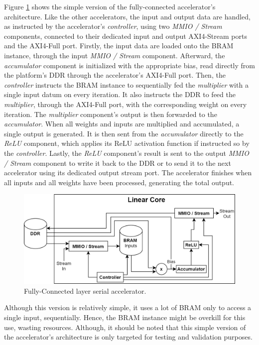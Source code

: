Figure \ref{fig:linear-core-serial} shows the simple version of the fully-connected accelerator's architecture. Like the other accelerators, the input and output data are handled, as instructed by the accelerator's \emph{controller}, using two \emph{MMIO / Stream} components, connected to their dedicated input and output AXI4-Stream ports and the AXI4-Full port. Firstly, the input data are loaded onto the BRAM instance, through the input \emph{MMIO / Stream} component. Afterward, the \emph{accumulator} component is initialized with the appropriate bias, read directly from the platform's DDR through the accelerator's AXI4-Full port. Then, the \emph{controller} instructs the BRAM instance to sequentially fed the \emph{multiplier} with a single input datum on every iteration. It also instructs the DDR to feed the \emph{multiplier}, through the AXI4-Full port, with the corresponding weight on every iteration. The \emph{multiplier} component's output is then forwarded to the \emph{accumulator}. When all weights and inputs are multiplied and accumulated, a single output is generated. It is then sent from the \emph{accumulator} directly to the \emph{ReLU} component, which applies its ReLU activation function if instructed so by the \emph{controller}. Lastly, the \emph{ReLU} component's result is sent to the output \emph{MMIO / Stream} component to write it back to the DDR or to send it to the next accelerator using its dedicated output stream port. The accelerator finishes when all inputs and all weights have been processed, generating the total output.

\begin{figure} [H]
	\centering
	\includegraphics[width=\textwidth]{Images/Platform/Linear_core_serial.png}
	\decoRule
	\caption[Fully-Connected layer serial accelerator]{Fully-Connected layer serial accelerator.}
	\label{fig:linear-core-serial}
\end{figure}

Although this version is relatively simple, it uses a lot of BRAM only to access a single input, sequentially. Hence, the BRAM instance might be overkill for this use, wasting resources. Although, it should be noted that this simple version of the accelerator's architecture is only targeted for testing and validation purposes.

